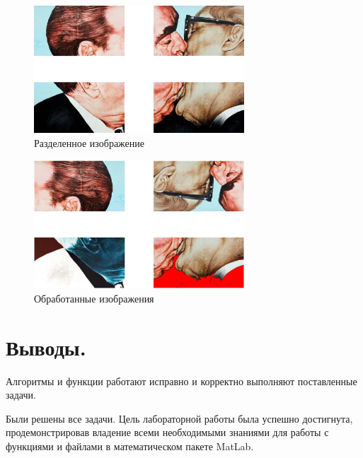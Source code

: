 \begin{figure}[H]
    \centering
    \includegraphics[width=0.7\textwidth]{figs/parted.png}
    \caption{Разделенное изображение}
    \label{fig:parted.png}
\end{figure}

\begin{figure}[H]
    \centering
    \includegraphics[width=0.7\textwidth]{figs/processed.png}
    \caption{Обработанные изображения}
    \label{fig:processed.png}
\end{figure}






\section*{Выводы.}
Алгоритмы и функции работают исправно и корректно выполняют поставленные задачи.

Были решены все задачи. Цель лабораторной работы была успешно достигнута, продемонстрировав владение всеми необходимыми знаниями для работы с функциями и файлами в математическом пакете MatLab.



